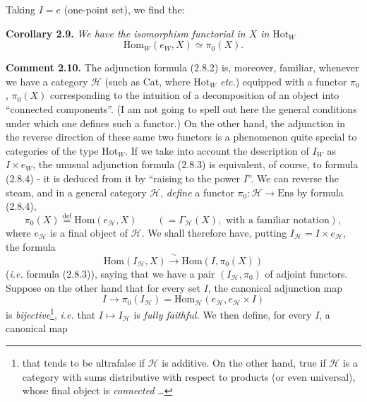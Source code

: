 \documentclass[11pt]{article}
\newcommand{\msp}[1]{\marginpar{\footnotesize [#1]}}
\begin{document}
Taking $I = e$ (one-point set), we find the:

\textbf{Corollary 2.9.} \textit{We have the isomorphism functorial in $X$ in} $\mathrm{Hot}_W$
\[
\boxed{\mathrm{Hom}_W(e_W, X) \simeq \pi_0(X).} \tag*{(2.8.4)}
\]

\textbf{Comment 2.10.} The adjunction formula (2.8.2) is, moreover, familiar, whenever we have a category $\mathcal{H}$ (such as Cat, where $\mathrm{Hot}_W$ \textit{etc.}) %
equipped with a functor $\pi_0$, $\pi_0(X)$ corresponding to the intuition of a decomposition of an object into ``connected components''. (I am not going to spell out here the general conditions under which one defines such a functor.) On the other hand, the adjunction in the reverse direction of these same two functors is a phenomenon quite special to categories \msp{page 16}of the type $\mathrm{Hot}_W$. If we take into account the description of $I_W$ as $I \times e_W$, the unusual adjunction formula (2.8.3) is equivalent, of course, to formula (2.8.4) - it is deduced from it by ``raising to the power $I$''. We can reverse the steam, and in a general category $\mathcal{H}$, \textit{define} a functor $\pi_0 : \mathcal{H} \longrightarrow \mathrm{Ens}$ by formula (2.8.4), %
\[
\pi_0(X) \overset{\text{def}}{=} \mathrm{Hom}(e_{\mathcal{H}}, X) \qquad (= \Gamma_{\mathcal{H}}(X), \text{ with a familiar notation}),
\]
where $e_{\mathcal{H}}$ is a final object of $\mathcal{H}$. We shall therefore have, putting $I_{\mathcal{H}} = I \times e_{\mathcal{H}}$, the formula
\[
\mathrm{Hom}(I_{\mathcal{H}}, X) \xrightarrow{\ \sim\ } \mathrm{Hom}(I, \pi_0(X))
\]
(\textit{i.e.} formula (2.8.3)), saying that we have a pair $(I_{\mathcal{H}}, \pi_0)$ of adjoint functors. Suppose on the other hand that for every set $I$, the canonical adjunction map
\[
I \longrightarrow \pi_0(I_{\mathcal{H}}) = \mathrm{Hom}_{\mathcal{H}}(e_{\mathcal{H}}, e_{\mathcal{H}} \times I)
\]
is \textit{bijective}\footnote{that tends to be ultrafalse if $\mathcal{H}$ is additive. On the other hand, true if $\mathcal{H}$ is a category with sums distributive with respect to products (or even universal), whose final object is \textit{connected} \ldots}, \textit{i.e.} that $I \longmapsto I_{\mathcal{H}}$ is \textit{fully faithful.} We then define, for every $I$, a canonical map
\end{document}
